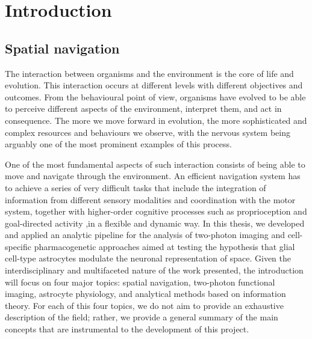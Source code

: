 
\chapter{Introduction} %

\label{Chapter1} %





\section{Spatial navigation}
\label{chap1:sec1:spatial_navigation}

The interaction between organisms and the environment is the core of life and evolution. 
This interaction occurs at different levels with different objectives and outcomes. 
From the behavioural point of view, organisms have evolved to be able to perceive different aspects of the environment, interpret them, and act in consequence. 
The more we move forward in evolution, the more sophisticated and complex resources and behaviours we observe, with the nervous system being arguably one of the most prominent examples of this process. 

One of the most fundamental aspects of such interaction consists of being able to move and navigate through the environment.
An efficient navigation system has to achieve a series of very difficult tasks that include the integration of information from different sensory modalities and coordination with the motor system, together with higher-order cognitive processes such as proprioception and goal-directed activity ,in a flexible and dynamic way.
In this thesis, we developed and applied an analytic pipeline for the analysis of two-photon imaging and cell-specific pharmacogenetic approaches aimed at testing the hypothesis that glial cell-type astrocytes modulate the neuronal representation of space. 
Given the interdisciplinary and multifaceted nature of the work presented, the introduction will focus on four major topics: spatial navigation, two-photon functional imaging, astrocyte physiology, and analytical methods based on information theory.
For each of this four topics, we do not aim to provide an exhaustive description of the field; rather, we provide a general summary of the main concepts that are instrumental to the development of this project.


